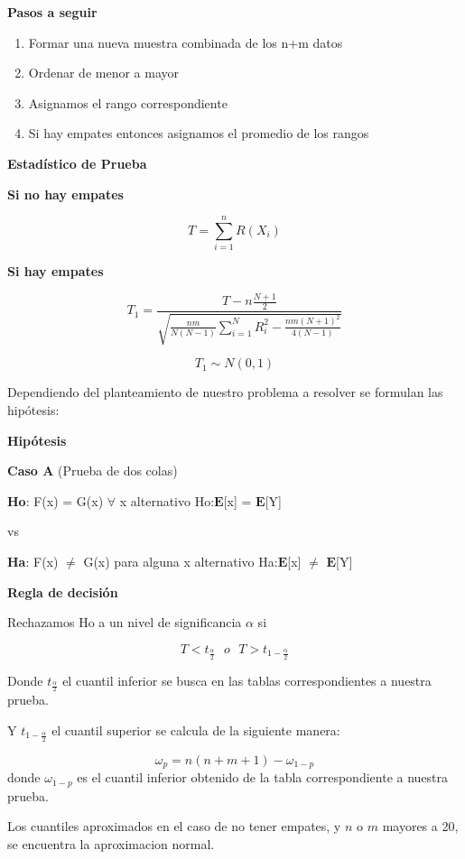 \documentclass[a4paper,oneside,openany]{book}
\providecommand{\tightlist}{%
  \setlength{\itemsep}{0pt}\setlength{\parskip}{0pt}}
\begin{document}
\textbf{Pasos a seguir}

\begin{enumerate}
\def\labelenumi{\arabic{enumi}.}
\tightlist
\item
  Formar una nueva muestra combinada de los n+m datos
\item
  Ordenar de menor a mayor
\item
  Asignamos el rango correspondiente
\item
  Si hay empates entonces asignamos el promedio de los rangos
\end{enumerate}

\textbf{Estadístico de Prueba}

\textbf{Si no hay empates}

\[T=\sum_{i=1}^{n}R(X_{i})\]

\textbf{Si hay empates}

\[T_1= \frac{T-n\frac{N+1}{2}}{\sqrt{\frac{nm}{N(N-1)}\sum_{i=1}^{N}R_i^2-\frac{nm(N+1)^2}{4(N-1)}}}\]

\[T_{1}\sim N(0,1)\]

Dependiendo del planteamiento de nuestro problema a resolver se formulan
las hipótesis:

\textbf{Hipótesis}

\textbf{Caso A} (Prueba de dos colas)

\textbf{Ho}: F(x) = G(x) \(\forall\) x alternativo
Ho:\(\mathbf{E}\){[}x{]} = \(\mathbf{E}\){[}Y{]}

vs

\textbf{Ha}: F(x) \(\neq\) G(x) para alguna x alternativo
Ha:\(\mathbf{E}\){[}x{]} \(\neq\) \(\mathbf{E}\){[}Y{]}

\textbf{Regla de decisión}

Rechazamos Ho a un nivel de significancia \(\alpha\) si

\[T < t_{\frac{\alpha}{2}} \ \ \   o \ \ \ T > t_{1-\frac{\alpha}{2}}\]

Donde \(t_\frac{\alpha}{2}\) el cuantil inferior se busca en las tablas
correspondientes a nuestra prueba.

Y \(t_{1-\frac{\alpha}{2}}\) el cuantil superior se calcula de la
siguiente manera:

\[\omega_p= n(n+m+1)-\omega_{1-p}\] donde \(\omega_{1-p}\) es el cuantil
inferior obtenido de la tabla correspondiente a nuestra prueba.

Los cuantiles aproximados en el caso de no tener empates, y \(n\) o
\(m\) mayores a 20, se encuentra la aproximacion normal.
\end{document}
